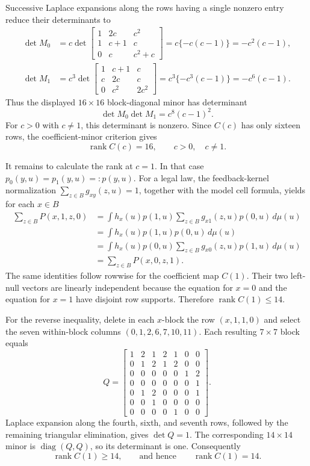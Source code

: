 Successive Laplace expansions along the rows having a single nonzero entry
reduce their determinants to
\[
\begin{aligned}
 \det M_0
 &=c\det\begin{bmatrix}
 1&2c&c^2\\ 1&c+1&c\\ 0&c&c^2+c
 \end{bmatrix}
 =c\{-c(c-1)\}=-c^2(c-1),\\
 \det M_1
 &=c^3\det\begin{bmatrix}
 1&c+1&c\\ c&2c&c\\ 0&c^2&2c^2
 \end{bmatrix}
 =c^3\{-c^3(c-1)\}=-c^6(c-1).
\end{aligned}
\]
Thus the displayed \(16\times16\) block-diagonal minor has determinant
\[
 \det M_0\det M_1=c^8(c-1)^2.
\]
For \(c>0\) with \(c\ne1\), this determinant is nonzero.  Since \(C(c)\)
has only sixteen rows, the coefficient-minor criterion gives
\[
 \operatorname{rank}C(c)=16,\qquad c>0,\quad c\ne1.
\]

It remains to calculate the rank at \(c=1\).  In that case
\(p_0(y,u)=p_1(y,u)=:p(y,u)\).  For a legal law, the feedback-kernel
normalization \(\sum_{z\in B}g_{xy}(z,u)=1\), together with the model cell
formula, yields for each \(x\in B\)
\[
\begin{aligned}
 \sum_{z\in B}P(x,1,z,0)
 &=\int h_x(u)p(1,u)
      \sum_{z\in B}g_{x1}(z,u)p(0,u)\,d\mu(u)\\
 &=\int h_x(u)p(1,u)p(0,u)\,d\mu(u)\\
 &=\int h_x(u)p(0,u)
      \sum_{z\in B}g_{x0}(z,u)p(1,u)\,d\mu(u)\\
 &=\sum_{z\in B}P(x,0,z,1).
\end{aligned}
\]
The same identities follow rowwise for the coefficient map \(C(1)\).
Their two left-null vectors are linearly independent because the equation for
\(x=0\) and the equation for \(x=1\) have disjoint row supports.  Therefore
\(\operatorname{rank}C(1)\le14\).

For the reverse inequality, delete in each \(x\)-block the row
\((x,1,1,0)\) and select the seven within-block columns
\((0,1,2,6,7,10,11)\).  Each resulting \(7\times7\) block equals
\[
 Q=\begin{bmatrix}
 1&2&1&2&1&0&0\\
 0&1&2&1&2&0&0\\
 0&0&0&0&0&1&2\\
 0&0&0&0&0&0&1\\
 0&1&2&0&0&0&1\\
 0&0&1&0&0&0&0\\
 0&0&0&0&1&0&0
 \end{bmatrix}.
\]
Laplace expansion along the fourth, sixth, and seventh rows, followed by the
remaining triangular elimination, gives \(\det Q=1\).  The corresponding
\(14\times14\) minor is \(\operatorname{diag}(Q,Q)\), so its determinant is
one.  Consequently
\[
 \operatorname{rank}C(1)\ge14,
 \qquad\text{and hence}\qquad
 \operatorname{rank}C(1)=14.
\]

